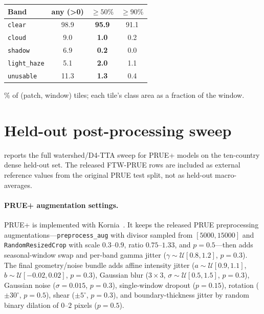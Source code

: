 \documentclass[10pt,twocolumn,letterpaper]{article}
\begin{document}
\begin{table}[h]
\begin{minipage}[t]{0.43\linewidth}
\begin{tabular}{l S[table-format=2.1] S[table-format=2.1] S[table-format=2.1]}
\toprule
{Band} & {any (\textgreater0)} & {\bfseries $\ge 50\%$} & {$\ge 90\%$} \\
\midrule
\texttt{clear}      & 98.9 & \bfseries 95.9 & 91.1 \\
\texttt{cloud}      &  9.0 & \bfseries  1.0 &  0.2 \\
\texttt{shadow}     &  6.9 & \bfseries  0.2 &  0.0 \\
\texttt{light\_haze}&  5.1 & \bfseries  2.0 &  1.1 \\
\texttt{unusable}   & 11.3 & \bfseries  1.3 &  0.4 \\
\bottomrule
\end{tabular}
\par\vspace{2pt}\footnotesize \% of (patch, window) tiles; each tile's class area as a fraction of the window.
\end{minipage}
\end{table}

\section{Held-out post-processing sweep}
\label{app:heldout_sweep}

 reports the full watershed/D4-TTA sweep for PRUE+ models on the ten-country dense held-out set. The released FTW-PRUE rows are included as external reference values from the original PRUE test split, not as held-out macro-averages.

\paragraph{PRUE+ augmentation settings.}
PRUE+ is implemented with Kornia~\cite{riba2020kornia}. It keeps the released PRUE preprocessing augmentations---\texttt{preprocess\_aug} with divisor sampled from $[5000,15000]$ and \texttt{RandomResizedCrop} with scale $0.3$--$0.9$, ratio $0.75$--$1.33$, and $p=0.5$---then adds seasonal-window swap and per-band gamma jitter ($\gamma\sim\mathcal{U}[0.8,1.2]$, $p=0.3$). The final geometry/noise bundle adds affine intensity jitter ($a\sim\mathcal{U}[0.9,1.1]$, $b\sim\mathcal{U}[-0.02,0.02]$, $p=0.3$), Gaussian blur ($3\times3$, $\sigma\sim\mathcal{U}[0.5,1.5]$, $p=0.3$), Gaussian noise ($\sigma=0.015$, $p=0.3$), single-window dropout ($p=0.15$), rotation ($\pm30^\circ$, $p=0.5$), shear ($\pm5^\circ$, $p=0.3$), and boundary-thickness jitter by random binary dilation of $0$--$2$ pixels ($p=0.5$).
\end{document}
